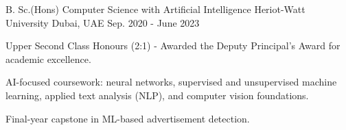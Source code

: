 

\begin{cventries}

  \cventry
	{B. Sc.(Hons) Computer Science with Artificial Intelligence} %
{Heriot-Watt University} %
{Dubai, UAE} %
{Sep. 2020 - June 2023} %
{
	\begin{cvitems} %
		\item {Upper Second Class Honours (2:1) - Awarded the Deputy Principal's Award for academic excellence.}
		\item {AI-focused coursework: neural networks, supervised and unsupervised machine learning, applied text analysis (NLP), and computer vision foundations.}
		\item {Final-year capstone in ML-based advertisement detection.}
	\end{cvitems}
}


\end{cventries}

